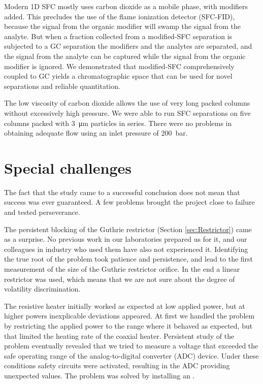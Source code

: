 Modern 1D SFC mostly uses carbon dioxide as a mobile phase, with modifiers
added.
This precludes the use of the flame ionization detector (SFC-FID), because the
signal from the organic modifier will swamp the signal from the analyte. But
when a fraction collected from a modified-SFC separation is subjected to a GC
separation the modifiers and the analytes are separated, and the signal from the
analyte can be captured while the signal from the organic modifier is ignored.
We demonstrated that modified-SFC comprehensively coupled to GC yields a
chromatographic space that can be used for novel separations and reliable
quantitation.

The low viscosity of carbon dioxide allows the use of very long packed columns
without excessively high pressure. We were able to run SFC separations on five
columns packed with \SI{3}{\micro\metre} particles in series. There were no
problems in obtaining adequate flow using an inlet pressure of \SI{200}{\bar}.

\section{Special challenges}

The fact that the study came to a successful conclusion does not mean that
success was ever guaranteed. A few problems brought the project close to
failure and tested perseverance.

The persistent blocking of the Guthrie restrictor (Section \ref{sec:Restrictor})
came as a surprise. No previous work in our laboratories prepared us for it, and
our colleagues in industry who used them have also not experienced it.
Identifying the true root of the problem took patience and persistence, and lead
to the first measurement of the size of the Guthrie restrictor orifice. In the
end a linear restrictor was used, which means that we are not sure about the
degree of volatility discrimination.

The resistive heater initially worked as expected at low applied power, but at
higher powers inexplicable deviations appeared. At first we handled the problem
by restricting the applied power to the range where it behaved as expected, but
that limited the heating rate of the coaxial heater. Persistent study of the
problem eventually revealed that we tried to measure a voltage that exceeded the
safe operating range of the analog-to-digital converter (ADC) device. Under
these conditions safety circuits were activated, resulting in the ADC providing
unexpected values. The problem was solved by installing an .


